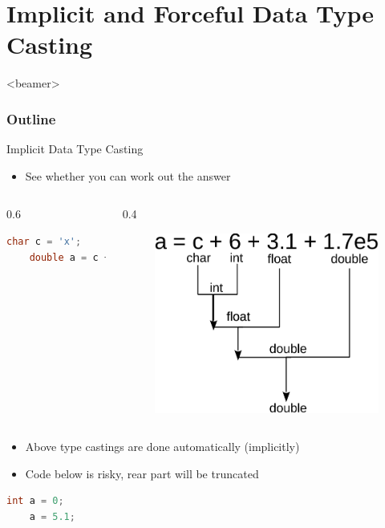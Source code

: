 \section{Implicit and Forceful Data Type Casting}
\begin{frame}<beamer>
    \frametitle{Outline}
    \tableofcontents[currentsection]
\end{frame}

\begin{frame}[fragile]{Implicit Data Type Casting}
\begin{itemize}
	\item {See whether you can work out the answer}
\end{itemize}
\begin{columns}
\begin{column}{0.6\linewidth}
	\begin{lstlisting}[numbers=none, language=c, frame=none]
	char c = 'x';
	double a = c + 5 + 1.3 + 1.73e4;
	\end{lstlisting}
\end{column}
\begin{column}{0.4\linewidth}
\begin{figure}
	\includegraphics[width=0.9\linewidth]{figs/cast.pdf}
\end{figure}
\end{column}
\end{columns}
\begin{itemize}
	\item {Above type castings are done automatically (implicitly)}
	\item {Code below is risky, rear part will be truncated}
\end{itemize}
	\begin{lstlisting}[numbers=none, language=c, frame=none]
	int a = 0;
	a = 5.1;
	\end{lstlisting}
\end{frame}

